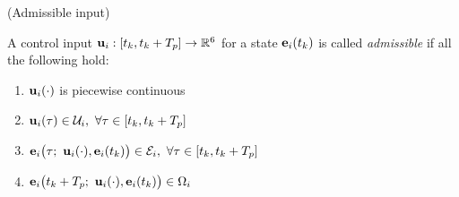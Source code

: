 \begin{bw_box}
\begin{definition} (Admissible input)\\[2.5ex]
  \label{definition:admissible_input}

  A control input $\bm{\mathbf{u}}_i : [t_k, t_k + T_p] \to \mathbb{R}^6$ for a state
  $\bm{\mathbf{e}}_i(t_k)$ is called \textit{admissible} if all the following hold:

  \begin{enumerate}
    \item $\bm{\mathbf{u}}_i(\cdot)$ is piecewise continuous
    \item $\vect{u}_i(\tau) \in \mathcal{U}_i,\ \forall \tau \in [t_k, t_k + T_p]$
    \item $\vect{e}_i\big(\tau;\ \vect{u}_i(\cdot), \vect{e}_i(t_k)\big) \in \mathcal{E}_i,\ \forall \tau \in [t_k, t_k + T_p]$
    \item $\vect{e}_i\big(t_k + T_p;\ \vect{u}_i(\cdot), \vect{e}_i(t_k)\big) \in \Omega_i$
  \end{enumerate}

\end{definition}
\end{bw_box}
